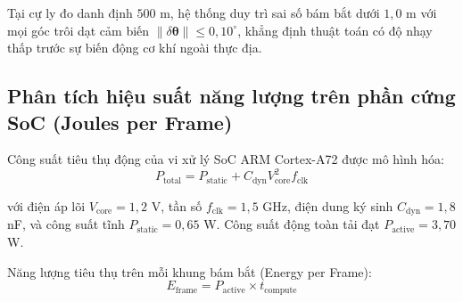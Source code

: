 Tại cự ly đo danh định $500$ m, hệ thống duy trì sai số bám bắt dưới $1{,}0$ m với mọi góc trôi dạt cảm biến $\|\delta\boldsymbol{\theta}\| \le 0{,}10^\circ$, khẳng định thuật toán có độ nhạy thấp trước sự biến động cơ khí ngoài thực địa.

\subsection{Phân tích hiệu suất năng lượng trên phần cứng SoC (Joules per Frame)}

\hspace{0.5cm} Công suất tiêu thụ động của vi xử lý SoC ARM Cortex-A72 được mô hình hóa:
\begin{equation}
P_{\text{total}} = P_{\text{static}} + C_{\text{dyn}} V_{\text{core}}^2 f_{\text{clk}}
\label{eq:soc-power-dissipation-formula-w15}
\end{equation}

với điện áp lõi $V_{\text{core}} = 1{,}2$ V, tần số $f_{\text{clk}} = 1{,}5$ GHz, điện dung ký sinh $C_{\text{dyn}} = 1{,}8$ nF, và công suất tĩnh $P_{\text{static}} = 0{,}65$ W. Công suất động toàn tải đạt $P_{\text{active}} = 3{,}70$ W.

Năng lượng tiêu thụ trên mỗi khung bám bắt (Energy per Frame):
\begin{equation}
E_{\text{frame}} = P_{\text{active}} \times t_{\text{compute}}
\label{eq:energy-per-frame-formula-w15}
\end{equation}

\begin{table}[H]
\centering
\caption{So sánh năng lượng tiêu thụ trên mỗi khung đo giữa các giải thuật lọc trên chip SoC}
\label{tab:energy-per-frame-comparison-w15}
\end{table}

